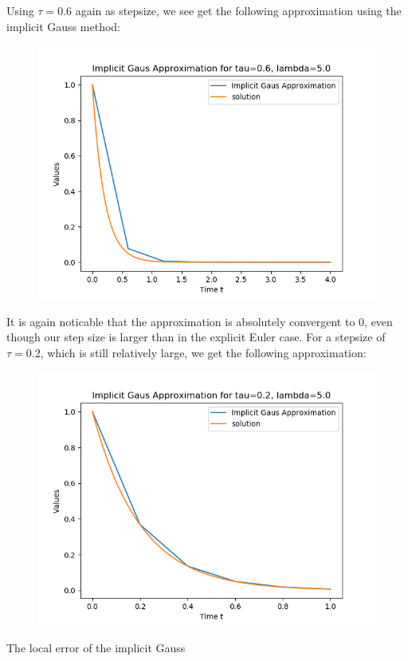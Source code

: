 \documentclass{article}
\theoremstyle{definition}
\begin{document}
\begin{itemize}
		Using $\tau = 0.6$ again as stepsize, we see get the
		following approximation using
		the implicit Gauss method:
		\begin{figure}[H]
			\includegraphics[scale=0.6]{implicit_gauss_06}
		\end{figure}
		It is again
		noticable that the approximation is absolutely convergent to
		$0$, even though our step size is larger than in the explicit
		Euler case. For a stepsize of $\tau=0.2$, which is still
		relatively large, we get the following approximation:
		\begin{figure}[H]
			\includegraphics[scale=0.6]{implicit_gauss_02}
		\end{figure}
		The local error of the implicit Gauss

\end{itemize}
\end{document}
